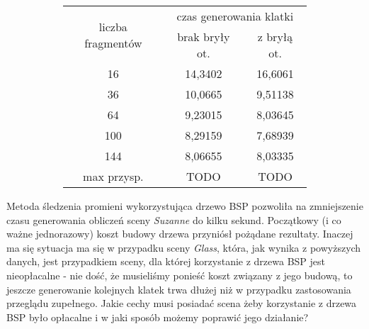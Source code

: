\begin{figure}[!htb]
\advance\leftskip-2cm
	\begin{subfigure}{.5\textwidth}
	\end{subfigure}
	\hspace{2cm}
	\begin{subfigure}{.5\textwidth}
	\begin{longtable}{|c|c|c|} \hline
	    \multirow{2}{*}{liczba fragmentów} & \multicolumn{2}{|c|}{czas generowania klatki} \\ \cline{2-3}
	    & brak bryły ot. & z bryłą ot. \\ \hline
	    16 & 14,3402 & 16,6061 \\ 
	    36 & 10,0665 & 9,51138 \\
		64 & 9,23015 & 8,03645 \\
		100 & 8,29159 & 7,68939 \\
		144 & 8,06655 & 8,03335 \\ \hline
		max przysp. & TODO & TODO \\ \hline
	\end{longtable}
\end{subfigure}
\end{figure}

Metoda śledzenia promieni wykorzystująca drzewo BSP pozwoliła na zmniejszenie czasu generowania obliczeń sceny \emph{Suzanne} do kilku sekund. Początkowy (i co ważne jednorazowy) koszt budowy drzewa przyniósł pożądane rezultaty. Inaczej ma się sytuacja ma się w przypadku sceny \emph{Glass}, która, jak wynika z powyższych danych, jest przypadkiem sceny, dla której korzystanie z drzewa BSP jest nieopłacalne - nie dość, że musieliśmy ponieść koszt związany z jego budową, to jeszcze generowanie kolejnych klatek trwa dłużej niż w przypadku zastosowania przeglądu zupełnego. Jakie cechy musi posiadać scena żeby korzystanie z drzewa BSP było opłacalne i w jaki sposób możemy poprawić jego działanie?

